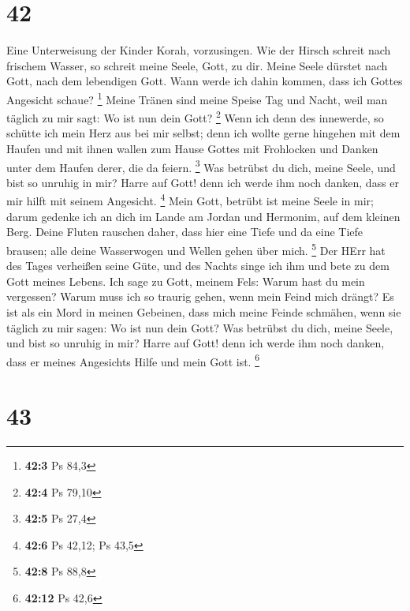 \hypertarget{section-41}{%
\section{42}\label{section-41}}

 Eine Unterweisung der Kinder Korah, vorzusingen.
 Wie der Hirsch schreit nach frischem Wasser, so schreit
meine Seele, Gott, zu dir.  Meine Seele dürstet nach Gott,
nach dem lebendigen Gott. Wann werde ich dahin kommen, dass ich Gottes
Angesicht schaue? \footnote{\textbf{42:3} Ps 84,3}  Meine
Tränen sind meine Speise Tag und Nacht, weil man täglich zu mir sagt: Wo
ist nun dein Gott? \footnote{\textbf{42:4} Ps 79,10}  Wenn
ich denn des innewerde, so schütte ich mein Herz aus bei mir selbst;
denn ich wollte gerne hingehen mit dem Haufen und mit ihnen wallen zum
Hause Gottes mit Frohlocken und Danken unter dem Haufen derer, die da
feiern. \footnote{\textbf{42:5} Ps 27,4}  Was betrübst du
dich, meine Seele, und bist so unruhig in mir? Harre auf Gott! denn ich
werde ihm noch danken, dass er mir hilft mit seinem Angesicht.
\footnote{\textbf{42:6} Ps 42,12; Ps 43,5}  Mein Gott,
betrübt ist meine Seele in mir; darum gedenke ich an dich im Lande am
Jordan und Hermonim, auf dem kleinen Berg.  Deine Fluten
rauschen daher, dass hier eine Tiefe und da eine Tiefe brausen; alle
deine Wasserwogen und Wellen gehen über mich. \footnote{\textbf{42:8} Ps
  88,8}  Der HErr hat des Tages verheißen seine Güte, und
des Nachts singe ich ihm und bete zu dem Gott meines Lebens.
 Ich sage zu Gott, meinem Fels: Warum hast du mein
vergessen? Warum muss ich so traurig gehen, wenn mein Feind mich drängt?
 Es ist als ein Mord in meinen Gebeinen, dass mich meine
Feinde schmähen, wenn sie täglich zu mir sagen: Wo ist nun dein Gott?
 Was betrübst du dich, meine Seele, und bist so unruhig
in mir? Harre auf Gott! denn ich werde ihm noch danken, dass er meines
Angesichts Hilfe und mein Gott ist. \footnote{\textbf{42:12} Ps 42,6}

\hypertarget{section-42}{%
\section{43}\label{section-42}}

